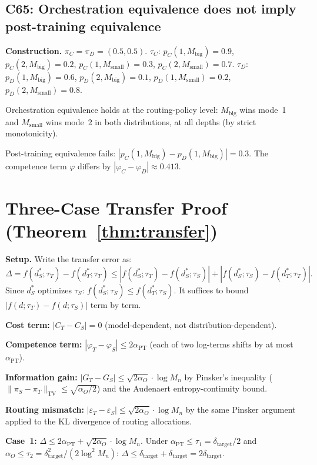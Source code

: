 \documentclass[11pt]{article}
\newcommand{\Mn}{M_n}
\newcommand{\dtarget}{\delta_{\mathrm{target}}}
\newcommand{\mismatch}{\varepsilon}
\begin{document}
\subsection{C65: Orchestration equivalence does not imply post-training equivalence}

\textbf{Construction.}
$\pi_C = \pi_D = (0.5, 0.5)$.
$\tau_C$: $p_C(1, M_{\mathrm{big}}) = 0.9$,
  $p_C(2, M_{\mathrm{big}}) = 0.2$,
  $p_C(1, M_{\mathrm{small}}) = 0.3$,
  $p_C(2, M_{\mathrm{small}}) = 0.7$.
$\tau_D$: $p_D(1, M_{\mathrm{big}}) = 0.6$,
  $p_D(2, M_{\mathrm{big}}) = 0.1$,
  $p_D(1, M_{\mathrm{small}}) = 0.2$,
  $p_D(2, M_{\mathrm{small}}) = 0.8$.

Orchestration equivalence holds at the routing-policy level:
$M_{\mathrm{big}}$ wins mode~1 and $M_{\mathrm{small}}$ wins mode~2
in both distributions, at all depths (by strict monotonicity).

Post-training equivalence fails:
$|p_C(1, M_{\mathrm{big}}) - p_D(1, M_{\mathrm{big}})| = 0.3$.
The competence term $\varphi$ differs by $|\varphi_C - \varphi_D|
\approx 0.413$.

\section{Three-Case Transfer Proof (Theorem~\ref{thm:transfer})}
\label{app:transfer}

\textbf{Setup.}
Write the transfer error as:
\[
  \Delta = f(d_S^*; \tau_T) - f(d_T^*; \tau_T)
  \le |f(d_S^*; \tau_T) - f(d_S^*; \tau_S)|
    + |f(d_S^*; \tau_S) - f(d_T^*; \tau_T)|.
\]
Since $d_S^*$ optimizes $\tau_S$: $f(d_S^*; \tau_S) \le f(d_T^*; \tau_S)$.
It suffices to bound $|f(d; \tau_T) - f(d; \tau_S)|$ term by term.

\textbf{Cost term:} $|C_T - C_S| = 0$ (model-dependent, not
distribution-dependent).

\textbf{Competence term:}
$|\varphi_T - \varphi_S| \le 2\alpha_{\mathrm{PT}}$ (each of two
log-terms shifts by at most $\alpha_{\mathrm{PT}}$).

\textbf{Information gain:}
$|G_T - G_S| \le \sqrt{2\alpha_O} \cdot \log\Mn$ by Pinsker's inequality
($\|\pi_S - \pi_T\|_{\mathrm{TV}} \le \sqrt{\alpha_O/2}$) and the
Audenaert entropy-continuity bound.

\textbf{Routing mismatch:}
$|\mismatch_T - \mismatch_S| \le \sqrt{2\alpha_O} \cdot \log\Mn$
by the same Pinsker argument applied to the KL divergence of routing
allocations.

\textbf{Case~1:}
$\Delta \le 2\alpha_{\mathrm{PT}} + \sqrt{2\alpha_O}\cdot\log\Mn$.
Under $\alpha_{\mathrm{PT}} \le \tau_1 = \dtarget/2$ and
$\alpha_O \le \tau_2 = \dtarget^2/(2\log^2\Mn)$:
$\Delta \le \dtarget + \dtarget = 2\dtarget$.
\end{document}
